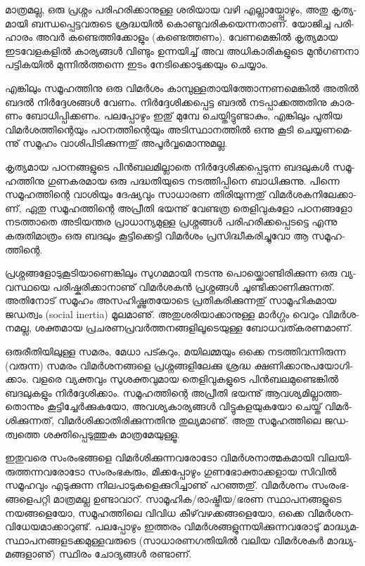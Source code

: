 ­മാ­ത്ര­മ­ല്ല, ഒരു പ്ര­ശ്നം പരി­ഹ­രി­ക്കാ­നു­ള്ള ശരി­യായ വഴി എല്ലാ­യ്പ്പോ­ഴും, അതു കൃ­ത്യ­മാ­യി ബന്ധ­പ്പെ­ട്ട­വ­രു­ടെ ശ്ര­ദ്ധ­യില്‍ 
കൊ­ണ്ടു­വ­രി­ക­യെ­ന്ന­താ­ണ്. യോ­ജി­ച്ച പരി­ഹാ­രം അവര്‍ കണ്ടെ­ത്തി­ക്കോ­ളും (ക­ണ്ടെ­ത്ത­ണം­). വേ­ണ­മെ­ങ്കില്‍ കൃ­ത്യ­മായ ഇട­വേ­ള­ക­ളില്‍ 
കാ­ര്യ­ങ്ങള്‍ വി­ണ്ടും ഉന്ന­യി­ച്ച് അവ അധി­കാ­രി­ക­ളു­ടെ മുന്‍­ഗ­ണ­നാ പട്ടി­ക­യില്‍ മു­ന്നില്‍­ത്ത­ന്നെ ഇടം നേ­ടി­ക്കൊ­ടു­ക്ക­യും ചെ­യ്യാം­.

എ­ങ്കി­ലും സമൂ­ഹ­ത്തി­നു ഒരു വി­മര്‍­ശം കാ­മ്പു­ള്ള­താ­യി­ത്തോ­ന്ന­ണ­മെ­ങ്കില്‍ അതില്‍ ബദല്‍ നിര്‍­ദ്ദേ­ശ­ങ്ങള്‍ വേ­ണം.
 നിര്‍­ദ്ദേ­ശി­ക്ക­പ്പെ­ട്ട ബദല്‍ നട­പ്പാ­ക്ക­ത്ത­തി­നു കാ­ര­ണം ബോ­ധി­പ്പി­ക്ക­ണം. പല­പ്പോ­ഴും ഇതു് മു­മ്പേ ചെ­യ്തി­ട്ടു­ണ്ടാ­കും, എങ്കി­ലും പു­തിയ 
 വി­മര്‍­ശ­ത്തി­ന്റെ­യും പഠ­ന­ത്തി­ന്റെ­യും അടി­സ്ഥാ­ന­ത്തില്‍ ഒന്നു കൂ­ടി ചെ­യ്യ­ണ­മെ­ന്നു് ­സ­മൂ­ഹം­ വാ­ശി­പി­ടി­ക്കു­ന്ന­തു് അപൂര്‍­വ്വ­മൊ­ന്നു­മ­ല്ല.

­കൃ­ത്യ­മായ പഠ­ന­ങ്ങ­ളു­ടെ പിന്‍­ബ­ല­മി­ല്ലാ­തെ നിര്‍­ദ്ദേ­ശി­ക്ക­പ്പെ­ടു­ന്ന ബദ­ലു­കള്‍ സമൂ­ഹ­ത്തി­നു ഗു­ണ­ക­ര­മായ ഒരു പദ്ധ­തി­യു­ടെ
 നട­ത്തി­പ്പി­നെ ബാ­ധി­ക്കു­ന്നു. പി­ന്നെ സമൂ­ഹ­ത്തി­ന്റെ വാ­ശി­യും ദേ­ഷ്യ­വും സാ­ധാ­രണ തി­രി­യു­ന്ന­തു് വി­മര്‍­ശ­ക­നി­ലേ­ക്കാ­ണ്, 
 ഏതു സമൂ­ഹ­ത്തി­ന്റെ അപ്രീ­തി ഭയ­ന്നു് വേ­ണ്ട­ത്ര തെ­ളി­വു­ക­ളോ പഠ­ന­ങ്ങ­ളോ നട­ത്താ­തെ അടി­യ­ന്തര പ്രാ­ധാ­ന്യ­മു­ള്ള പ്ര­ശ്ന­ങ്ങള്‍ 
 പരി­ഹ­രി­ക്ക­പ്പെ­ട­ട്ടെ എന്നു കരു­തി­മാ­ത്രം ഒരു ബദ­ലും കൂ­ട്ടി­ക്കെ­ട്ടി വി­മര്‍­ശം പ്ര­സി­ദ്ധീ­ക­രി­ച്ചു­വോ ആ സമൂ­ഹ­ത്തി­ന്റെ­.

­പ്ര­ശ്ന­ങ്ങ­ളോ­ടു­കൂ­ടി­യാ­ണെ­ങ്കി­ലും സു­ഗ­മ­മാ­യി നട­ന്നു പൊ­യ്ക്കൊ­ണ്ടി­രി­ക്കു­ന്ന ഒരു വ്യ­വ­സ്ഥ­യെ പരി­ഷ്ക­രി­ക്കാ­നാ­ണു് വി­മര്‍­ശ­കന്‍ പ്ര­ശ്ന­ങ്ങള്‍ 
ചൂ­ണ്ടി­ക്കാ­ണി­ക്കു­ന്ന­ത്. അതി­നോ­ട് സമൂ­ഹം അസ­ഹി­ഷ്ണു­ത­യോ­ടെ പ്ര­തി­ക­രി­ക്കു­ന്ന­തു് സാ­മൂ­ഹി­ക­മായ ജഡ­ത്വം (social inertia) മൂ­ല­മാ­ണു്. 
അതു­ശ­രി­യാ­ക്കാ­നു­ള്ള മാര്‍­ഗ്ഗം വെ­റും വി­മര്‍­ശ­ന­മ­ല്ല, ശക്ത­മായ പ്ര­ച­ര­ണ­പ്ര­വര്‍­ത്ത­ന­ങ്ങ­ളി­ലൂ­ടെ­യു­ള്ള ബോ­ധ­വ­ത്ക­ര­ണ­മാ­ണ്.

ഒ­രു­രീ­തി­യി­ലു­ള്ള സമ­രം, മേ­ധാ പട്ക­റും, മയി­ല­മ്മ­യും ഒക്കെ നട­ത്തി­വ­ന്നി­രു­ന്ന (വ­രു­ന്ന) ­സ­മ­രം­ വി­മര്‍­ശ­ന­ങ്ങ­ളെ പ്ര­ശ്ന­ങ്ങ­ളി­ലേ­ക്കു 
ശ്ര­ദ്ധ ക്ഷ­ണി­ക്കാ­നു­പ­യോ­ഗി­ക്കാം. വള­രെ വ്യ­ക്ത­വും സു­ശ­ക്ത­വു­മായ തെ­ളി­വു­ക­ളു­ടെ പിന്‍­ബ­ല­മു­ണ്ടെ­ങ്കില്‍ ബദ­ലു­ക­ളും നിര്‍­ദ്ദേ­ശി­ക്കാം.
 സമൂ­ഹ­ത്തി­ന്റെ അപ്രീ­തി ഭയ­ന്നു് ആവ­ശ്യ­മി­ല്ലാ­ത്ത­തൊ­ന്നും കൂ­ട്ടി­ച്ചേര്‍­ക്കു­ക­യോ, അവ­ശ്യ­കാ­ര്യ­ങ്ങള്‍ വി­ട്ടു­ക­ള­യു­ക­യോ ചെ­യ്ത് വി­മര്‍­ശി­ക്കു­ന്ന­ത്, 
 വി­മര്‍­ശി­ക്കാ­തി­രി­ക്കു­ന്ന­തി­നു തു­ല്യ­മാ­ണു്. അതു സമൂ­ഹ­ത്തി­ലെ ജഡ­ത്വ­ത്തെ ശക്തി­പ്പെ­ടു­ത്തുക മാ­ത്ര­മേ­യു­ള്ളൂ­.

ഇ­തു­വ­രെ സം­രം­ഭ­ങ്ങ­ളെ വി­മര്‍­ശി­ക്കു­ന്ന­വ­രോ­ടോ വി­മര്‍­ശ­നാ­ത്മ­ക­മാ­യി വി­ല­യി­രു­ത്ത­ന്ന­വ­രോ­ടോ സം­രം­ഭ­ക­രും, മി­ക്ക­പ്പോ­ഴും 
ഗു­ണ­ഭോ­ക്താ­ക്ക­ളായ സി­വില്‍ സമൂ­ഹ­വും എടു­ക്കു­ന്ന നി­ല­പാ­ടു­ക­ളെ­ക്കു­റി­ച്ചാ­ണു് പറ­ഞ്ഞ­തു്. വി­മര്‍­ശ­നം സം­രം­ഭ­ങ്ങ­ളെ­പ­റ്റി മാ­ത്ര­മ­ല്ല ഉണ്ടാ­വാ­റ്.
 സാ­മൂ­ഹി­ക/­രാ­ഷ്ട്രീ­യ/­ഭ­രണ സ്ഥാ­പ­ന­ങ്ങ­ളു­ടെ നയ­ങ്ങ­ളെ­യോ, സമൂ­ഹ­ത്തി­ലെ വി­വിധ കീ­ഴ്‌­വ­ഴ­ക്ക­ങ്ങ­ളെ­യോ, ഒക്കെ വി­മര്‍­ശ­ന­വി­ധേ­യ­മാ­ക്കാ­റു­ണ്ട്. 
 പല­പ്പോ­ഴും ഇത്ത­രം വി­മര്‍­ശ­ങ്ങ­ളു­ന്ന­യി­ക്കു­ന്ന­വ­രോ­ടു് മാ­ദ്ധ്യ­മ­സ്ഥാ­പ­ന­ങ്ങ­ള­ട­ക്ക­മു­ള്ള­വ­രു­ടെ (സാ­ധാ­ര­ണ­ഗ­തി­യില്‍ വലിയ വി­മര്‍­ശ­കര്‍ മാ­ദ്ധ്യ­മ­ങ്ങ­ളാ­ണു്)
  സ്ഥി­രം ചോ­ദ്യ­ങ്ങള്‍ രണ്ടാ­ണ്.

